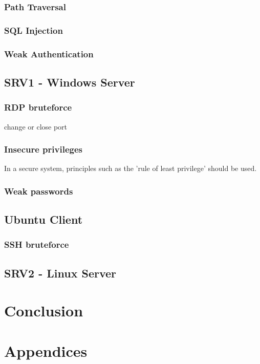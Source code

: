 \documentclass{report}
\begin{document}
\subsection{Path Traversal}
\subsection{SQL Injection}
\subsection{Weak Authentication}

\section{SRV1 - Windows Server}
\subsection{RDP bruteforce}
	change or close port
\subsection{Insecure privileges}
In a secure system, principles such as the 'rule of least privilege' should be used.
\subsection{Weak passwords}

\section{Ubuntu Client}
\subsection{SSH bruteforce}

\section{SRV2 - Linux Server}



\chapter{Conclusion}

\chapter{Appendices}
\end{document}
